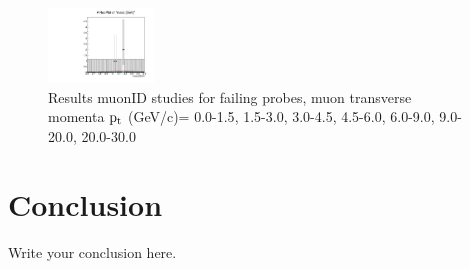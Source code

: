 \documentclass{article}
\begin{document}
\begin{figure}
    \includegraphics[width=0.25\textwidth]{../PlotsRooFitMC/croofit_id_fail_6.pdf}
    \caption{Results muonID studies for failing probes, muon transverse momenta
    $\rm p_{t}$ (GeV/c)= {0.0-1.5}, {1.5-3.0}, {3.0-4.5}, {4.5-6.0}, 
    {6.0-9.0}, {9.0-20.0}, {20.0-30.0}}
\end{figure}





\section{Conclusion}
Write your conclusion here.
\end{document}
